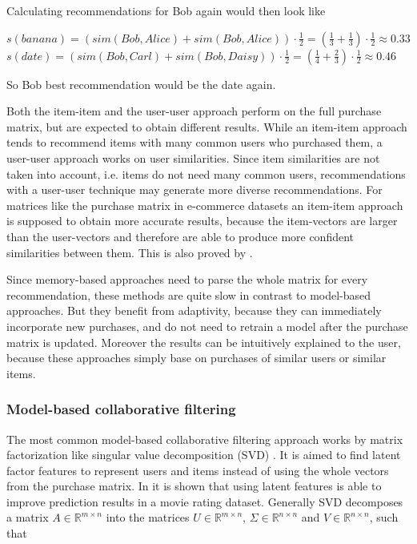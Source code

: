 \documentclass[10pt]{reportMaster}
\begin{document}
Calculating recommendations for Bob again would then look like

$s(banana) = (sim(Bob, Alice) + sim(Bob, Alice)) \cdot \frac{1}{2} = (\frac{1}{3} + \frac{1}{3}) \cdot \frac{1}{2} \approx 0.33$
$s(date) = (sim(Bob, Carl) + sim(Bob, Daisy)) \cdot \frac{1}{2} = (\frac{1}{4} + \frac{2}{3}) \cdot \frac{1}{2} \approx 0.46$

So Bob best recommendation would be the date again.

Both the item-item and the user-user approach perform on the full purchase matrix, but are expected to obtain different results.
While an item-item approach tends to recommend items with many common users who purchased them, a user-user approach works on user similarities.
Since item similarities are not taken into account, i.e. items do not need many common users, recommendations with a user-user technique may generate more diverse recommendations.
For matrices like the purchase matrix in e-commerce datasets an item-item approach is supposed to obtain more accurate results, because the item-vectors are larger than the user-vectors and therefore are able to produce more confident similarities between them.
This is also proved by \cite{itemItemAlgorithms}. 

Since memory-based approaches need to parse the whole matrix for every recommendation, these methods are quite slow in contrast to model-based approaches.
But they benefit from adaptivity, because they can immediately incorporate new purchases, and do not need to retrain a model after the purchase matrix is updated.
Moreover the results can be intuitively explained to the user, because these approaches simply base on purchases of similar users or similar items.


\subsubsection{Model-based collaborative filtering}
\label{sec:modelBasedCF}
The most common model-based collaborative filtering approach works by matrix factorization like singular value decomposition (SVD) \cite{svdGolubGeneral}.
It is aimed to find latent factor features to represent users and items instead of using the whole vectors from the purchase matrix.
In \cite{SVDNeuralNet} it is shown that using latent features is able to improve prediction results in a movie rating dataset.
Generally SVD decomposes a matrix $A \in \mathds{R}^{m \times n}$ into the matrices $U \in \mathds{R}^{m \times n}$, $\Sigma \in \mathds{R}^{n \times n}$ and $V \in \mathds{R}^{n \times n}$, such that 
\end{document}
